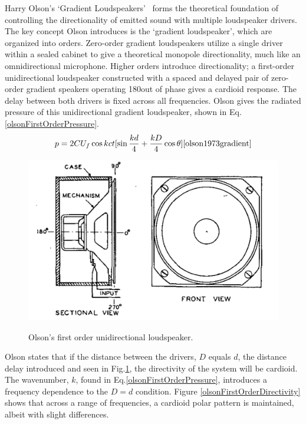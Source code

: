 \documentclass{report}
\begin{document}
        Harry Olson's `Gradient Loudspeakers'~\cite{olson1973gradient} forms the theoretical foundation of controlling the directionality of emitted sound with multiple loudspeaker drivers.
        The key concept Olson introduces is the `gradient loudspeaker', which are organized into orders.
        Zero-order gradient loudspeakers utilize a single driver within a sealed cabinet to give a theoretical monopole directionality, much like an omnidirectional microphone.
        Higher orders introduce directionality; a first-order unidirectional loudspeaker constructed with a spaced and delayed pair of zero-order gradient speakers operating 180\degree\@ out of phase gives a cardioid response.
        The delay between both drivers is fixed across all frequencies.
        Olson gives the radiated pressure of this unidirectional gradient loudspeaker, shown in Eq.\ref{olsonFirstOrderPressure}.
        \begin{equation}
            p = 2CU_f\cos{kct}[\sin{\frac{kd}{4}+\frac{kD}{4}\cos{\theta}}]
            \label{olsonFirstOrderPressure}
            \cite{olson1973gradient}
        \end{equation}
        \begin{figure}[H]
            \centering
            \includegraphics[scale=0.4]{figs/olsonFirstOrder.png}%
            \caption{Olson's first order unidirectional loudspeaker.}\cite{olson1973gradient}
            \label{olsonFirstOrderDiagram}
        \end{figure}
        Olson states that if the distance between the drivers, $D$ equals $d$, the distance delay introduced and seen in Fig.\ref{olsonFirstOrderDiagram}, the directivity of the system will be cardioid.
        The wavenumber, $k$, found in Eq.\ref{olsonFirstOrderPressure}, introduces a frequency dependence to the $D=d$ condition.
        Figure \ref{olsonFirstOrderDirectivity} shows that across a range of frequencies, a cardioid polar pattern is maintained, albeit with slight differences.
\end{document}
